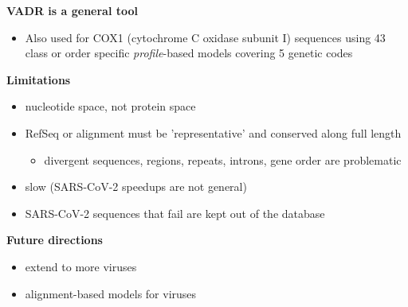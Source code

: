\documentclass[landscape]{slides}
\begin{document}
\begin{slide}
\begin{center}
\textbf{VADR is a general tool}
\end{center}

\small
\begin{itemize}
\item Also used for COX1 (cytochrome C oxidase subunit I) sequences
  using 43 class or order specific \emph{profile}-based models
  covering 5 genetic codes
\end{itemize}

\normalsize
\begin{center}
  \textbf{Limitations}
\end{center}

\small
\begin{itemize}
\item nucleotide space, not protein space
\item RefSeq or alignment must be 'representative' and conserved along
  full length
  \begin{itemize}
    \item divergent sequences, regions, repeats, introns, gene order are problematic
  \end{itemize}
\item slow (SARS-CoV-2 speedups are not general)
\item SARS-CoV-2 sequences that fail are kept out of the database
\end{itemize}

\normalsize
\begin{center}
  \textbf{Future directions}
\end{center}

\small
\begin{itemize}
\item extend to more viruses
\item alignment-based models for viruses
\end{itemize}

\vfill
\end{slide}
%
\end{document}
